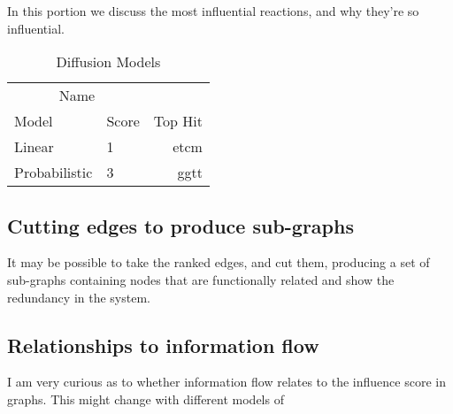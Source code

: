 \documentclass[twoside]{article}
\begin{document}
\begin{multicols}{2}
In this portion we discuss the most influential reactions, and why
they're so influential.

\begin{table}[H]
\caption{Diffusion Models}
\centering
\begin{tabular}{llr}
\toprule
\multicolumn{2}{c}{Name} \\
\cmidrule(r){1-2}
Model & Score & Top Hit \\
\midrule
Linear & 1 & etcm \\
Probabilistic & 3 & ggtt \\
\bottomrule
\end{tabular}
\end{table}


\subsection{Cutting edges to produce sub-graphs}

It may be possible to take the ranked edges, and cut them, producing a
set of sub-graphs containing nodes that are functionally related and
show the redundancy in the system.

\subsection{Relationships to information flow}

I am very curious as to whether information flow relates to the
influence score in graphs.  This might change with different models of 






\end{multicols}
\end{document}
